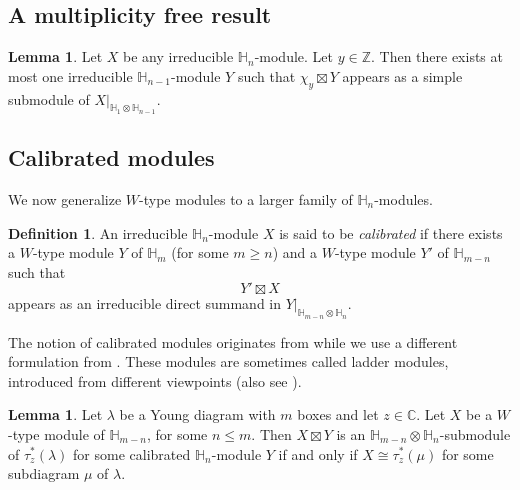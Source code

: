 \documentclass[11pt]{amsart}
\numberwithin{equation}{section}
\theoremstyle{definition}
\newtheorem{lemma}[thm]{Lemma}
\newtheorem{definition}[thm]{Definition}
\begin{document}
\subsection{A multiplicity free result}

\begin{lemma} \label{lem derivative} \cite{grojnowski2001strong}
Let $X$ be any irreducible $\mathbb H_n$-module. Let $y \in \mathbb Z$. Then there exists at most one irreducible $\mathbb H_{n-1}$-module $Y$ such that $\chi_y\boxtimes Y$ appears as a simple submodule of $X|_{\mathbb H_1\otimes \mathbb H_{n-1}}$.
\end{lemma}








\subsection{Calibrated modules}



We now generalize $W$-type modules to a larger family of $\mathbb H_n$-modules.


\begin{definition} \label{def calibrate}
 An irreducible $\mathbb H_n$-module $X$ is said to be \emph{calibrated} if there exists a $W$-type module $Y$ of $\mathbb H_m$ (for some $m \geq n$) and a $W$-type module $Y'$ of $\mathbb H_{m-n}$ such that 
 \[  Y' \boxtimes X
 \]
appears as an irreducible direct summand in $Y|_{\mathbb H_{m-n}\otimes \mathbb H_n}$.
\end{definition}
The notion of calibrated modules originates from \cite{krillo2002gha} while we use a different formulation from  \cite{krillo2002gha}. These modules are sometimes called ladder modules, introduced from different viewpoints \cite{lapidminguezladder} (also see \cite{barabschciubotaruladder}). 



\begin{lemma} \label{lem restrict w type}
Let $\lambda$ be a Young diagram with $m$ boxes and let $z \in \mathbb C$. Let $X$ be a $W$-type module of $\mathbb H_{m-n}$, for some $n \leq m$. Then $X \boxtimes Y$ is an $\mathbb H_{m-n}\otimes \mathbb H_n$-submodule of $\tau_z^*(\lambda)$ for some calibrated $\mathbb H_{n}$-module $Y$ if and only if $X \cong \tau^*_z(\mu)$ for some subdiagram $\mu$  of $\lambda$.
\end{lemma}
\end{document}
